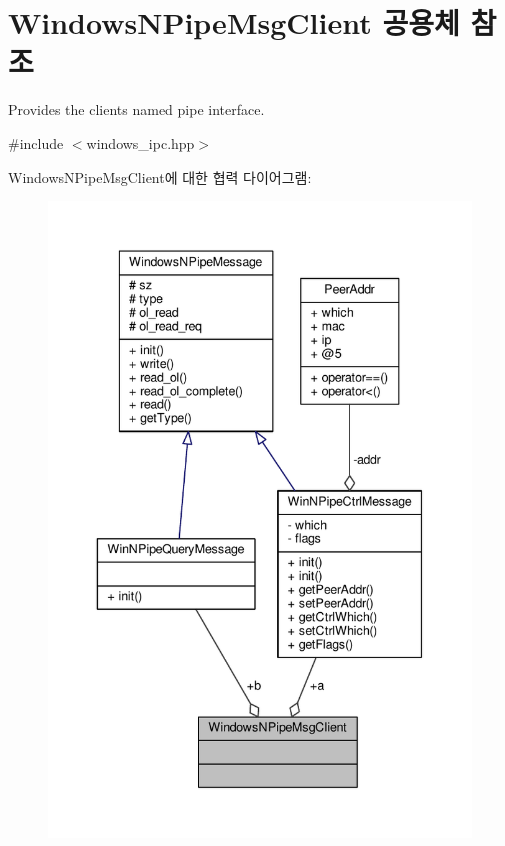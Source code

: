 \hypertarget{union_windows_n_pipe_msg_client}{}\section{Windows\+N\+Pipe\+Msg\+Client 공용체 참조}
\label{union_windows_n_pipe_msg_client}


Provides the client\textquotesingle{}s named pipe interface.  




{\ttfamily \#include $<$windows\+\_\+ipc.\+hpp$>$}



Windows\+N\+Pipe\+Msg\+Client에 대한 협력 다이어그램\+:
\nopagebreak
\begin{figure}[H]
\begin{center}
\leavevmode
\includegraphics[width=342pt]{union_windows_n_pipe_msg_client__coll__graph}
\end{center}
\end{figure}
